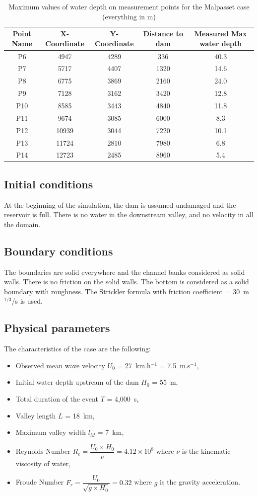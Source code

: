 \begin{table}[H]
  \centering
  \begin{tabular}{|c|c|c|c|c|}
    \hline Point Name & X-Coordinate & Y-Coordinate & Distance to dam & Measured Max water depth \\
    \hline P6 & 4947 & 4289 & 336 & 40.3\\
    P7 & 5717 & 4407 & 1320 & 14.6\\
    P8 & 6775 & 3869 & 2160 & 24.0\\
    P9 & 7128 & 3162 & 3420 & 12.8\\
    P10 & 8585 & 3443 & 4840 & 11.8 \\
    P11 & 9674 & 3085 & 6000 & 8.3\\
    P12 & 10939 & 3044 & 7220 & 10.1\\
    P13 & 11724 & 2810 & 7980 & 6.8 \\
    P14 & 12723 & 2485 & 8960 & 5.4\\
    \hline
  \end{tabular}
  \caption{Maximum values of water depth on measurement points for the Malpasset case
  (everything in m)}
  \label{tab:malpasset:MaxMeasures}
\end{table}

\subsection{Initial conditions}
At the beginning of the simulation, the dam is assumed undamaged and the
reservoir is full.
There is no water in the downstream valley, and no velocity in all the domain.
\subsection{Boundary conditions}
The boundaries are solid everywhere and the channel banks considered as solid
walls.
There is no friction on the solid walls.
The bottom is considered as a solid boundary with roughness.
The Strickler formula with friction coefficient = 30~m$^{1/3}$/s is used.

\subsection{Physical parameters}

The characteristics of the case are the following:
\begin{itemize}
  \itemsep0em
\item Observed mean wave velocity $U_0$ = 27~km.h$^{-1}$ = 7.5~m.s$^{-1}$,
\item Initial water depth upstream of the dam $H_0$ = 55~m,
\item Total duration of the event $T$ = 4,000~s,
\item Valley length $L$ = 18~km,
\item Maximum valley width $l_M$ = 7~km,
\item Reynolds Number \textbf{$R_e = \dfrac{U_0 \times H_0}{\nu} =  4.12 \times 10^8$}
where $\nu$ is the kinematic viscosity of water,
\item Froude Number \textbf{$F_r = \dfrac{U_0}{\sqrt{g \times H_0}} = 0.32$}
where $g$ is the gravity acceleration.
\end{itemize}

